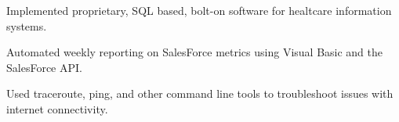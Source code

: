 \documentclass[]{deemweaver}
\begin{document}
\begin{minipage}[t]{0.66\textwidth}
\begin{tightemize}
\item Implemented proprietary, SQL based, bolt-on software for healtcare information systems.
\end{tightemize}
\sectionsep

\begin{tightemize}
\item Automated weekly reporting on SalesForce metrics using Visual Basic and the SalesForce API.
\end{tightemize}
\sectionsep

\begin{tightemize}
\item Used traceroute, ping, and other command line tools to troubleshoot issues with internet connectivity.
\end{tightemize}
\sectionsep


%
%


\end{minipage}
\end{document}
